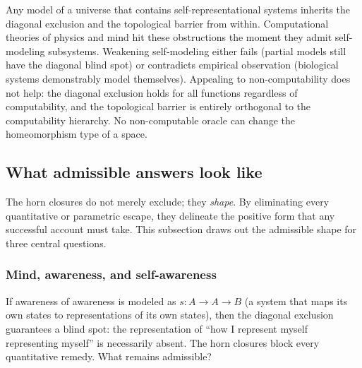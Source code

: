 \documentclass[11pt]{article}
\begin{document}
\begin{keybox}[title={Inherited obstructions and the non-computability escape}]
Any model of a universe that contains self-representational systems
inherits the diagonal exclusion and the topological barrier from
within.  Computational theories of physics and mind hit these
obstructions the moment they admit self-modeling subsystems.
Weakening self-modeling either fails (partial models still have the
diagonal blind spot) or contradicts empirical observation (biological
systems demonstrably model themselves).  Appealing to
non-computability does not help: the diagonal exclusion holds for all
functions regardless of computability, and the topological barrier is
entirely orthogonal to the computability hierarchy.  No non-computable
oracle can change the homeomorphism type of a space.
\end{keybox}

\subsection{What admissible answers look like}
\label{sec:admissible-shape}

The horn closures do not merely exclude; they \emph{shape}.  By
eliminating every quantitative or parametric escape, they delineate
the positive form that any successful account must take.  This
subsection draws out the admissible shape for three central questions.

\subsubsection{Mind, awareness, and self-awareness}
\label{sec:admissible-mind}

If awareness of awareness is modeled as $s : A \to A \to B$ (a system
that maps its own states to representations of its own states), then
the diagonal exclusion guarantees a blind spot: the representation of
``how I represent myself representing myself'' is necessarily absent.
The horn closures block every quantitative remedy.  What remains
admissible?
\end{document}
